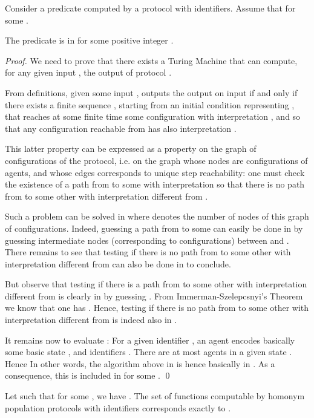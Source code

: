 \documentclass[UKenglish]{llncs}
\begin{document}
\begin{proposition}\label{th:olivier}
Consider a predicate computed by a protocol with 
identifiers. Assume that  for some .   

The predicate is in  for some positive integer . 
\end{proposition}
\begin{proof}
We need to prove that there exists a Turing Machine that can compute, for any given input ,
the output of protocol .

From definitions, given some input ,  outputs the output  on
input  if and only if  there exists a finite sequence , starting from an
initial condition  representing , that reaches at some finite time
  some configuration  with interpretation , and so that any
configuration reachable from  has also interpretation . 

This latter property can be expressed as a property on the graph of
configurations of the protocol, i.e. on the graph whose nodes are
configurations of  agents, and whose edges corresponds to unique step
reachability:  one must check the existence of a path
from  to some  with interpretation  so that there is no
path from  to some other  with interpretation different from
. 

Such a problem can be solved in  where 
denotes the number of nodes of this graph of configurations. 
Indeed, guessing a path from  to
some  can easily be done in  by guessing
intermediate nodes (corresponding to configurations) between  and . There remains to
see that testing if there is no
path from  to some other  with interpretation different from
 can also be done in  to conclude.

But observe that testing if there is a path from  to some other
 with interpretation different from  is clearly in  by guessing . From Immerman-Szelepcsnyi's Theorem
\cite{immerman1988nondeterministic,Szelepcsenyi} we know that one has 
. Hence, testing if there is no path
from  to some other  with interpretation different from
 is indeed also in .

It remains now to evaluate : 
For a given identifier , an agent encodes basically some basic state , and  identifiers . There are at most  agents
in  a given state .
Hence  
In other words, the algorithm above in  is
hence basically in . As a
consequence, this
is 
included in 
for some . \hfill \qed

\end{proof}

\begin{theorem}\label{th:main}
Let   such that for some , we have .
The set of functions computable by homonym population protocols with 
identifiers corresponds exactly to .

\end{theorem}
\end{document}
